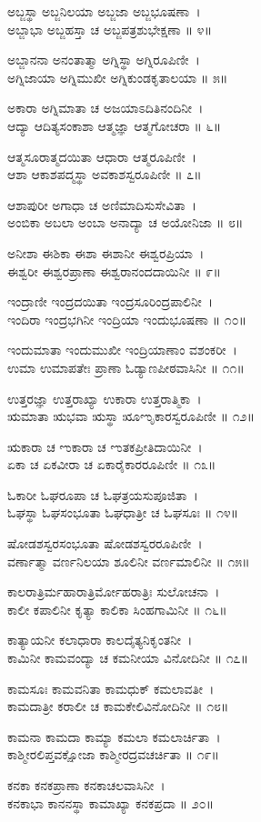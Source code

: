ಅಬ್ಜಸ್ಥಾ ಅಬ್ಜನಿಲಯಾ ಅಬ್ಜಜಾ ಅಬ್ಜಭೂಷಣಾ~।\\
ಅಬ್ಜಾಭಾ ಅಬ್ಜಹಸ್ತಾ ಚ ಅಬ್ಜಪತ್ರಶುಭೇಕ್ಷಣಾ ॥ ೪॥

ಅಬ್ಜಾನನಾ ಅನಂತಾತ್ಮಾ ಅಗ್ನಿಸ್ಥಾ ಅಗ್ನಿರೂಪಿಣೀ~।\\
ಅಗ್ನಿಜಾಯಾ ಅಗ್ನಿಮುಖೀ ಅಗ್ನಿಕುಂಡಕೃತಾಲಯಾ ॥ ೫॥

ಅಕಾರಾ ಅಗ್ನಿಮಾತಾ ಚ ಅಜಯಾಽದಿತಿನಂದಿನೀ~।\\
ಆದ್ಯಾ ಆದಿತ್ಯಸಂಕಾಶಾ ಆತ್ಮಜ್ಞಾ ಆತ್ಮಗೋಚರಾ ॥ ೬॥

ಆತ್ಮಸೂರಾತ್ಮದಯಿತಾ ಆಧಾರಾ ಆತ್ಮರೂಪಿಣೀ~।\\
ಆಶಾ ಆಕಾಶಪದ್ಮಸ್ಥಾ ಅವಕಾಶಸ್ವರೂಪಿಣೀ ॥ ೭॥

ಆಶಾಪುರೀ ಅಗಾಧಾ ಚ ಅಣಿಮಾದಿಸುಸೇವಿತಾ~।\\
ಅಂಬಿಕಾ ಅಬಲಾ ಅಂಬಾ ಅನಾದ್ಯಾ ಚ ಅಯೋನಿಜಾ ॥ ೮॥

ಅನೀಶಾ ಈಶಿಕಾ ಈಶಾ ಈಶಾನೀ ಈಶ್ವರಪ್ರಿಯಾ~।\\
ಈಶ್ವರೀ ಈಶ್ವರಪ್ರಾಣಾ ಈಶ್ವರಾನಂದದಾಯಿನೀ ॥ ೯॥

ಇಂದ್ರಾಣೀ ಇಂದ್ರದಯಿತಾ ಇಂದ್ರಸೂರಿಂದ್ರಪಾಲಿನೀ~।\\
ಇಂದಿರಾ ಇಂದ್ರಭಗಿನೀ ಇಂದ್ರಿಯಾ ಇಂದುಭೂಷಣಾ ॥ ೧೦॥

ಇಂದುಮಾತಾ ಇಂದುಮುಖೀ ಇಂದ್ರಿಯಾಣಾಂ ವಶಂಕರೀ~।\\
ಉಮಾ ಉಮಾಪತೇಃ ಪ್ರಾಣಾ ಓಡ್ಯಾಣಪೀಠವಾಸಿನೀ ॥ ೧೧॥

ಉತ್ತರಜ್ಞಾ ಉತ್ತರಾಖ್ಯಾ ಉಕಾರಾ ಉತ್ತರಾತ್ಮಿಕಾ~।\\
ಋಮಾತಾ ಋಭವಾ ಋಸ್ಥಾ ೠಌೃಕಾರಸ್ವರೂಪಿಣೀ ॥ ೧೨॥

ಋಕಾರಾ ಚ ಌಕಾರಾ ಚ ಌತಕಪ್ರೀತಿದಾಯಿನೀ~।\\
ಏಕಾ ಚ ಏಕವೀರಾ ಚ ಏಕಾರೈಕಾರರೂಪಿಣೀ ॥ ೧೩॥

ಓಕಾರೀ ಓಘರೂಪಾ ಚ ಓಘತ್ರಯಸುಪೂಜಿತಾ~।\\
ಓಘಸ್ಥಾ ಓಘಸಂಭೂತಾ ಓಘಧಾತ್ರೀ ಚ ಓಘಸೂಃ ॥ ೧೪॥

ಷೋಡಶಸ್ವರಸಂಭೂತಾ ಷೋಡಶಸ್ವರರೂಪಿಣೀ~।\\
ವರ್ಣಾತ್ಮಾ ವರ್ಣನಿಲಯಾ ಶೂಲಿನೀ ವರ್ಣಮಾಲಿನೀ ॥ ೧೫॥

ಕಾಲರಾತ್ರಿರ್ಮಹಾರಾತ್ರಿರ್ಮೋಹರಾತ್ರಿಃ ಸುಲೋಚನಾ~।\\
ಕಾಲೀ ಕಪಾಲಿನೀ ಕೃತ್ಯಾ ಕಾಲಿಕಾ ಸಿಂಹಗಾಮಿನೀ ॥ ೧೬॥

ಕಾತ್ಯಾಯನೀ ಕಲಾಧಾರಾ ಕಾಲದೈತ್ಯನಿಕೃಂತನೀ~।\\
ಕಾಮಿನೀ ಕಾಮವಂದ್ಯಾ ಚ ಕಮನೀಯಾ ವಿನೋದಿನೀ ॥ ೧೭॥

ಕಾಮಸೂಃ ಕಾಮವನಿತಾ ಕಾಮಧುಕ್ ಕಮಲಾವತೀ~।\\
ಕಾಮದಾತ್ರೀ ಕರಾಲೀ ಚ ಕಾಮಕೇಲಿವಿನೋದಿನೀ ॥ ೧೮॥

ಕಾಮನಾ ಕಾಮದಾ ಕಾಮ್ಯಾ ಕಮಲಾ ಕಮಲಾರ್ಚಿತಾ~।\\
ಕಾಶ್ಮೀರಲಿಪ್ತವಕ್ಷೋಜಾ ಕಾಶ್ಮೀರದ್ರವಚರ್ಚಿತಾ ॥ ೧೯॥

ಕನಕಾ ಕನಕಪ್ರಾಣಾ ಕನಕಾಚಲವಾಸಿನೀ~।\\
ಕನಕಾಭಾ ಕಾನನಸ್ಥಾ ಕಾಮಾಖ್ಯಾ ಕನಕಪ್ರದಾ ॥ ೨೦॥

